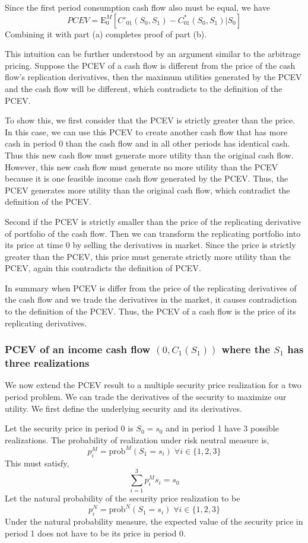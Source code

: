 \documentclass{article}[12pt letter]
\newcommand{\E}{\mathrm{E}}
\begin{document}
Since the first period consumption cash flow also must be equal, we have
\[PCEV = \E_0^M[ C'_{01}(S_0,S_1) - C^*_{01}(S_0,S_1) |S_0] \]
Combining it with part (a) completes proof of part (b).
\endproof




This intuition can be further understood by an argument similar to the arbitrage pricing. Suppose the PCEV of a cash flow is different from the price of the cash flow's replication derivatives, then the maximum utilities generated by the PCEV and the cash flow will be different, which contradicts to the definition of the PCEV. 

To show this, we first consider that the PCEV is strictly greater than the price. In this case, we can use this PCEV to create another cash flow that has more cash in period 0 than the cash flow and in all other periods has identical cash. Thus this new cash flow must generate more utility than the original cash flow. However, this new cash flow must generate no more utility than the PCEV because it is one feasible income cash flow generated by the PCEV. Thus, the PCEV generates more utility than the original cash flow, which contradict the definition of the PCEV. 

Second if the PCEV is strictly smaller than the price of the replicating derivative of portfolio of the cash flow. Then we can transform the replicating portfolio into its price at time 0 by selling the derivatives in market. Since the price is strictly greater than the PCEV, this price must generate strictly more utility than the PCEV, again this contradicts the definition of PCEV. 

In summary when PCEV is differ from the price of the replicating derivatives of the cash flow and we trade the derivatives in the market, it causes contradiction to the definition of the PCEV. Thus, the PCEV of a cash flow is the price of its replicating derivatives. 

\subsubsection{PCEV of an income cash flow $(0,C_1(S_1))$ where the $S_1$ has three realizations}

We now extend the PCEV result to a multiple security price realization for a two period problem. We can trade the derivatives of the security to maximize our utility. We first define the underlying security and its derivatives. 


Let the security price in period 0 is $S_0 =s_0$ and in period 1 have $3$ possible realizations.  The probability of realization under risk neutral measure is,
\[p_i^M = \text {prob}^M (S_1 = s_i) \; \forall i \in \{1,2,3\} \]
This must satisfy,
\[ \sum_{i=1}^3 p_i^M s_i = s_0 \]
Let the natural probability of the security price realization to be
\[p_i^N = \text{prob}^N(S_1 = s_i) \; \forall i \in \{1,2,3 \} \]
Under the natural probability measure, the expected value of the security price in period 1 does not have to be its price in period 0. 
 
\end{document}
